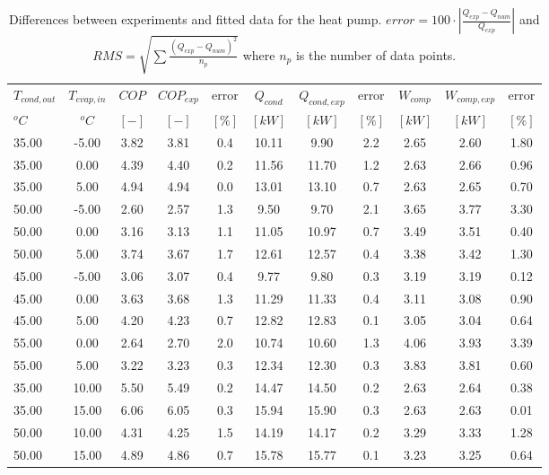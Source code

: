 \documentclass[english]{SPFShortReport}
\begin{document}
\begin{table}[!ht]
\begin{small}
\caption{Differences between experiments and fitted data for the heat pump.          $error=100 \cdot |\frac{Q_{exp}-Q_{num}}{Q_{exp}}|$ and $RMS = \sqrt { \sum{\frac{(Q_{exp}-Q_{num})^2}{n_p}} }$ where $n_p$ is the number of data points.}
\begin{center}
\resizebox{12cm}{!} 
{
\begin{tabular}{l | c c c c c c c c c c } 
\hline
\hline
$T_{cond,out}$ &$T_{evap,in}$ &$COP$ &$COP_{exp}$ &error &$Q_{cond}$ &$Q_{cond,exp}$ &error &$W_{comp}$ &$W_{comp,exp}$ &error \\ 
$^oC$ &$^oC$ &$[-]$ &$[-]$ &$[\%]$ &$[kW]$ &$[kW]$ &$[\%]$ &$[kW]$ &$[kW]$ &$[\%]$\\ 
\hline
35.00  & -5.00 & 3.82 & 3.81 & 0.4 & 10.11 & 9.90 & 2.2 & 2.65 & 2.60 & 1.80\\ 
35.00  & 0.00 & 4.39 & 4.40 & 0.2 & 11.56 & 11.70 & 1.2 & 2.63 & 2.66 & 0.96\\ 
35.00  & 5.00 & 4.94 & 4.94 & 0.0 & 13.01 & 13.10 & 0.7 & 2.63 & 2.65 & 0.70\\ 
50.00  & -5.00 & 2.60 & 2.57 & 1.3 & 9.50 & 9.70 & 2.1 & 3.65 & 3.77 & 3.30\\ 
50.00  & 0.00 & 3.16 & 3.13 & 1.1 & 11.05 & 10.97 & 0.7 & 3.49 & 3.51 & 0.40\\ 
50.00  & 5.00 & 3.74 & 3.67 & 1.7 & 12.61 & 12.57 & 0.4 & 3.38 & 3.42 & 1.30\\ 
45.00  & -5.00 & 3.06 & 3.07 & 0.4 & 9.77 & 9.80 & 0.3 & 3.19 & 3.19 & 0.12\\ 
45.00  & 0.00 & 3.63 & 3.68 & 1.3 & 11.29 & 11.33 & 0.4 & 3.11 & 3.08 & 0.90\\ 
45.00  & 5.00 & 4.20 & 4.23 & 0.7 & 12.82 & 12.83 & 0.1 & 3.05 & 3.04 & 0.64\\ 
55.00  & 0.00 & 2.64 & 2.70 & 2.0 & 10.74 & 10.60 & 1.3 & 4.06 & 3.93 & 3.39\\ 
55.00  & 5.00 & 3.22 & 3.23 & 0.3 & 12.34 & 12.30 & 0.3 & 3.83 & 3.81 & 0.60\\ 
35.00  & 10.00 & 5.50 & 5.49 & 0.2 & 14.47 & 14.50 & 0.2 & 2.63 & 2.64 & 0.38\\ 
35.00  & 15.00 & 6.06 & 6.05 & 0.3 & 15.94 & 15.90 & 0.3 & 2.63 & 2.63 & 0.01\\ 
50.00  & 10.00 & 4.31 & 4.25 & 1.5 & 14.19 & 14.17 & 0.2 & 3.29 & 3.33 & 1.28\\ 
50.00  & 15.00 & 4.89 & 4.86 & 0.7 & 15.78 & 15.77 & 0.1 & 3.23 & 3.25 & 0.64\\ 

\end{tabular}}
\end{center}
\end{small}
\end{table}
\end{document}
